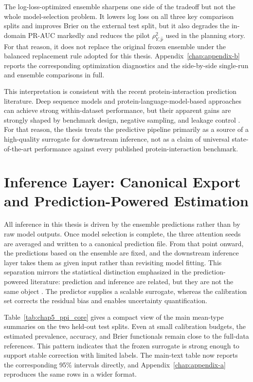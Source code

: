 The log-loss-optimized ensemble sharpens one side of the tradeoff but not the whole model-selection problem. It lowers log loss on all three key comparison splits and improves Brier on the external test split, but it also degrades the in-domain PR-AUC markedly and reduces the pilot \(\rho_{Y,\hat p}^2\) used in the planning story. For that reason, it does not replace the original frozen ensemble under the balanced replacement rule adopted for this thesis. Appendix~\ref{chap:appendix-b} reports the corresponding optimization diagnostics and the side-by-side single-run and ensemble comparisons in full.

This interpretation is consistent with the recent protein-interaction prediction literature. Deep sequence models and protein-language-model-based approaches can achieve strong within-dataset performance, but their apparent gains are strongly shaped by benchmark design, negative sampling, and leakage control \parencite{park2012, dscript2021, xcapt52024, bernett2024}. For that reason, the thesis treats the predictive pipeline primarily as a source of a high-quality surrogate for downstream inference, not as a claim of universal state-of-the-art performance against every published protein-interaction benchmark.

\section[Inference Layer]{Inference Layer: Canonical Export and Prediction-Powered Estimation}

All inference in this thesis is driven by the ensemble predictions rather than by raw model outputs. Once model selection is complete, the three attention seeds are averaged and written to a canonical prediction file. From that point onward, the predictions based on the ensemble are fixed, and the downstream inference layer takes them as given input rather than revisiting model fitting. This separation mirrors the statistical distinction emphasized in the prediction-powered literature: prediction and inference are related, but they are not the same object \parencite{ppi_framework, ppi_pp, llmjudge_eif}. The predictor supplies a scalable surrogate, whereas the calibration set corrects the residual bias and enables uncertainty quantification.

Table~\ref{tab:chap5_ppi_core} gives a compact view of the main mean-type summaries on the two held-out test splits. Even at small calibration budgets, the estimated prevalence, accuracy, and Brier functionals remain close to the full-data references. This pattern indicates that the frozen surrogate is strong enough to support stable correction with limited labels. The main-text table now reports the corresponding 95\% intervals directly, and Appendix~\ref{chap:appendix-a} reproduces the same rows in a wider format.


